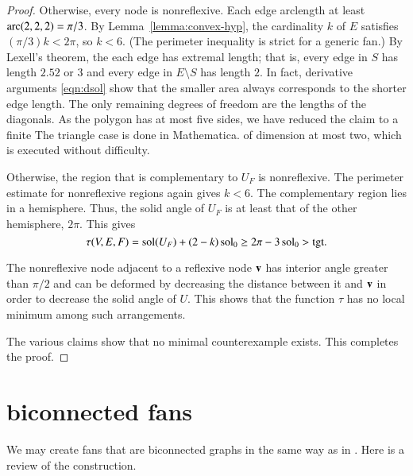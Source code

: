 \documentclass{llncs}
\def\op#1{{\hbox{#1}}}
\begin{document}
\begin{proof}
  Otherwise,
every node is nonreflexive.  Each edge arclength at least
$\operatorname{arc}(2,2,2)=\pi/3$.  By Lemma~\ref{lemma:convex-hyp}, the cardinality
$k$ of $E$ satisfies $(\pi/3)k < 2\pi$, so $k<6$.  (The perimeter inequality is
strict for a generic fan.)  By Lexell's theorem, the each edge has
extremal length;  that is, every edge in $S$ has length $2.52$ or
$3$ and every edge in $E\setminus S$ has length $2$.  In fact, derivative
arguments \eqref{eqn:dsol} show that the smaller area always
corresponds to the shorter edge length.  The only
remaining degrees of freedom are the lengths of the diagonals.  As the
polygon has at most five sides, we have reduced the claim  to a
finite  %
{The triangle case is done in Mathematica.} of dimension at
most two, which is executed without difficulty.

  Otherwise, the region that is complementary
to $U_F$ is nonreflexive.  The perimeter estimate for nonreflexive regions again
gives $k<6$.  The complementary region lies in a hemisphere.  Thus,
the solid angle of $U_F$ is at least that of the other hemisphere,
$2\pi$.
%
This gives
\[
\tau(V,E,F) = \sol(U_F) + (2-k)\sol_0 \ge 2\pi - 3\sol_0 > \op{tgt}.
\]


The nonreflexive node adjacent to a reflexive node ${\mathbf v}$ has interior angle greater
than $\pi/2$ and can be deformed by decreasing the distance between it
and ${\mathbf v}$ in order to decrease the solid angle of $U$.  This shows that the
function $\tau$ has no local minimum among such arrangements.


The various claims show that no minimal counterexample exists.  This
completes the proof.
\end{proof}

\section{biconnected fans}


We may create  fans that are biconnected graphs in the same way as in
\cite{Hales:2006:DCG}.  Here is a review
of the construction.
\end{document}
